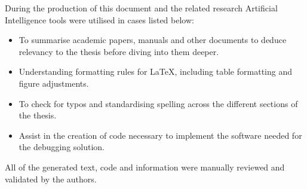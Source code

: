 During the production of this document and the related research Artificial Intelligence tools were utilised in cases listed below:

\begin{itemize}
    \item To summarise academic papers, manuals and other documents to deduce relevancy to the thesis before diving into them deeper.
    \item Understanding formatting rules for \LaTeX, including table formatting and figure
    adjustments.
    \item To check for typos and standardising spelling across the different sections of the thesis.
    \item Assist in the creation of code necessary to implement the software needed for the debugging solution.
  \end{itemize}

  All of the generated text, code and information were manually reviewed and validated by the authors.



